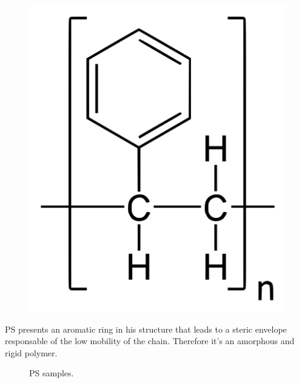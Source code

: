 \documentclass[a4paper, 11pt]{article}
\begin{document}
\begin{figure}[htp]
	\centering
	{\includegraphics[scale=0.06]{ps_chem}}
	\captionsetup{justification=centering}
	\label{fig:PE}
\end{figure}
PS presents an aromatic ring in his structure that leads to a steric envelope responsable of the low mobility of the chain. Therefore it's an amorphous and rigid polymer.

\begin{figure}[htp]
	\centering
	\qquad
	\captionsetup{justification=centering}
	\caption{PS samples.}
	\label{fig:PS}
\end{figure} 
\end{document}
